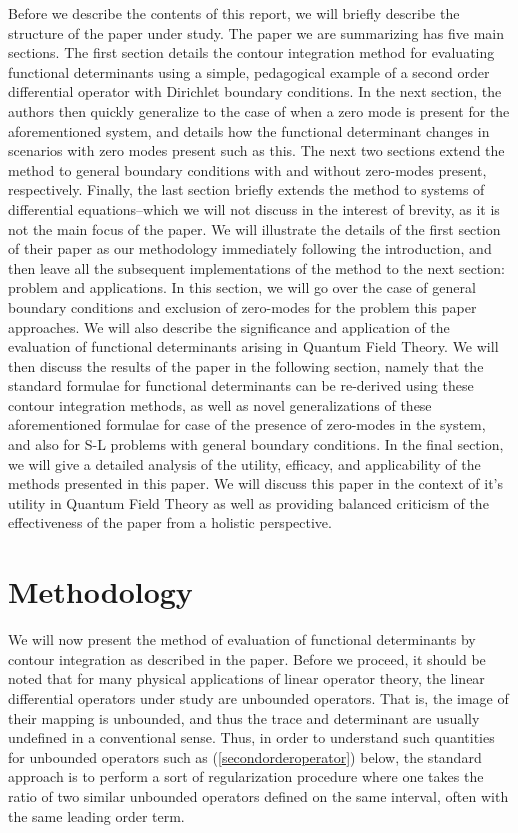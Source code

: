 \documentclass[12]{article}
\begin{document}
Before we describe the contents of this report, we will briefly describe the structure of the paper under study.
The paper we are summarizing has five main sections. The first section details the contour integration method for evaluating functional determinants using a simple, pedagogical example of a second order differential operator with Dirichlet boundary conditions. In the next section, the authors then quickly generalize to the case of when a zero mode is present for the aforementioned system, and details how the functional determinant changes in scenarios with zero modes present such as this. The next two sections extend the method to general boundary conditions with and without zero-modes present, respectively. Finally, the last section briefly extends the method to systems of differential equations--which we will not discuss in the interest of brevity, as it is not the main focus of the paper. We will illustrate the details of the first section of their paper as our methodology immediately following the introduction, and then leave all the subsequent implementations of the method to the next section: problem and applications. In this section, we will go over the case of general boundary conditions and exclusion of zero-modes for the problem this paper approaches. We will also describe the significance and application of the evaluation of functional determinants arising in Quantum Field Theory. We will then discuss the results of the paper in the following section, namely that the standard formulae for functional determinants can be re-derived using these contour integration methods, as well as novel generalizations of these aforementioned formulae for case of the presence of zero-modes in the system, and also for S-L problems with general boundary conditions. In the final section, we will give a detailed analysis of the utility, efficacy, and applicability of the methods presented in this paper. We will discuss this paper in the context of it's utility in Quantum Field Theory as well as providing balanced criticism of the effectiveness of the paper from a holistic perspective. 

\section{Methodology}

We will now present the method of evaluation of functional determinants by contour integration as described in the paper. Before we proceed, it should be noted that for many physical applications of linear operator theory, the linear differential operators under study are unbounded operators. That is, the image of their mapping is unbounded, and thus the trace and determinant are usually undefined in a conventional sense. Thus, in order to understand such quantities for unbounded operators such as (\ref{secondorderoperator}) below, the standard approach is to perform a sort of regularization procedure where one takes the ratio of two similar unbounded operators defined on the same interval, often with the same leading order term. \\
\end{document}
